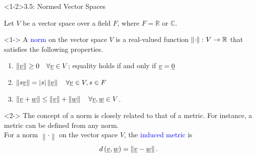 \documentclass[10pt,english,aspectratio=169]{beamer}
\begin{document}
\begin{frame}<1-2>{3.5: Normed Vector Spaces}

Let $V$ be a vector space over a field $F$, where $F = \mathbb{R}$ or $\mathbb{C}$.

\begin{definition}<1->
A \textcolor{blue}{norm} on the vector space $V$ is a real-valued function $\left\| \cdot \right\| \colon V \rightarrow \mathbb{R}$ that satisfies the following properties.
\begin{enumerate}
\item $\left\| \underline{v} \right\| \geq 0 \quad \forall \underline{v} \in V$;
equality holds if and only if $\underline{v} = \underline{0}$
\item $\left\| s \underline{v} \right\| = |s| \left\| \underline{v} \right\| \quad \forall \underline{v} \in V, s \in F$
\item $\left\| \underline{v} + \underline{w} \right\| \leq
\left\| \underline{v} \right\| + \left\| \underline{w} \right\| \quad \forall \underline{v}, \underline{w} \in V$.
\end{enumerate}
\end{definition}

\vspace{3mm}

\begin{uncoverenv}<2->
The concept of a norm is closely related to that of a metric.
For instance, a metric can be defined from any norm.\\[2mm]
For a norm $\left\| \cdot \right\|$ on the vector space $V$, the \textcolor{blue}{induced metric} is
\begin{equation*}
d \left( \underline{v}, \underline{w} \right)
= \left\| \underline{v} - \underline{w} \right\|.
\end{equation*}
\end{uncoverenv}


\end{frame}
\end{document}
